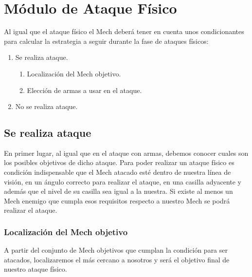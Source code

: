 \documentclass[a4paper,12pt,oneside]{book}
\begin{document}
\section{Módulo de Ataque Físico}
Al igual que el ataque físico el Mech deberá tener en cuenta unos condicionantes para calcular la estrategia a seguir  durante la fase de ataques físicos:
\begin{enumerate}
\item Se realiza ataque.
\begin{enumerate}
\item Localización del Mech objetivo.
\item Elección de armas a usar en el ataque.
\end{enumerate}
\item No se realiza ataque.
\end{enumerate}
\subsection*{Se realiza ataque}
En primer lugar, al igual que en el ataque con armas, debemos conocer cuales son los posibles objetivos de dicho ataque. Para poder realizar un ataque físico es condición indispensable que el Mech atacado esté dentro de nuestra línea de visión, en un ángulo correcto para realizar el ataque, en una casilla adyacente y además que el nivel de su casilla sea igual a la nuestra. Si existe al menos un Mech enemigo que cumpla esos requisitos respecto a nuestro Mech se podrá realizar el ataque.
\subsubsection*{Localización del Mech objetivo}
A partir del conjunto de Mech objetivos que cumplan la condición para ser atacados, localizaremos el más cercano a nosotros y será el objetivo final de nuestro ataque físico.
\end{document}
